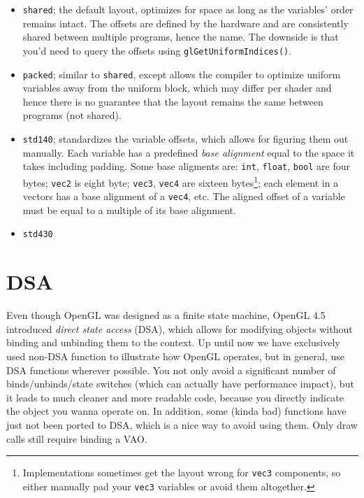 \documentclass[8pt, table, xcdraw]{article}%
\begin{document}
\begin{itemize}
    \item \lstinline{shared}; the default layout, optimizes for space as long as the variables' order remains intact. The offsets are defined by the hardware and are consistently shared between multiple programs, hence the name. The downside is that you'd need to query the offsets using \lstinline{glGetUniformIndices()}.
    \item \lstinline{packed}; similar to \lstinline{shared}, except allows the compiler to optimize uniform variables away from the uniform block, which may differ per shader and hence there is no guarantee that the layout remains the same between programs (not shared).
    \item \lstinline{std140}; standardizes the variable offsets, which allows for figuring them out manually. Each variable has a predefined \emph{base alignment} equal to the space it takes including padding. Some base aligments are: \lstinline{int}, \lstinline{float}, \lstinline{bool} are four bytes; \lstinline{vec2} is eight byte; \lstinline{vec3}, \lstinline{vec4} are sixteen bytes\footnote{Implementations sometimes get the layout wrong for \lstinline{vec3} components, so either manually pad your \lstinline{vec3} variables or avoid them altogether.}; each element in a vectors has a base alignment of a \lstinline{vec4}, etc. The aligned offset of a variable must be equal to a multiple of its base alignment.
    \item \lstinline{std430}
\end{itemize}

\section{DSA} \label{DSA}

Even though OpenGL was designed as a finite state machine, OpenGL 4.5 introduced \emph{direct state access} (DSA), which allows for modifying objects without binding and unbinding them to the context. Up until now we have exclusively used non-DSA function to illustrate how OpenGL operates, but in general, use DSA functions wherever possible. You not only avoid a significant number of binds/unbinds/state switches (which can actually have performance impact), but it leads to much cleaner and more readable code, because you directly indicate the object you wanna operate on. In addition, some (kinda bad) functions have just not been ported to DSA, which is a nice way to avoid using them. Only draw calls still require binding a VAO.
\end{document}

